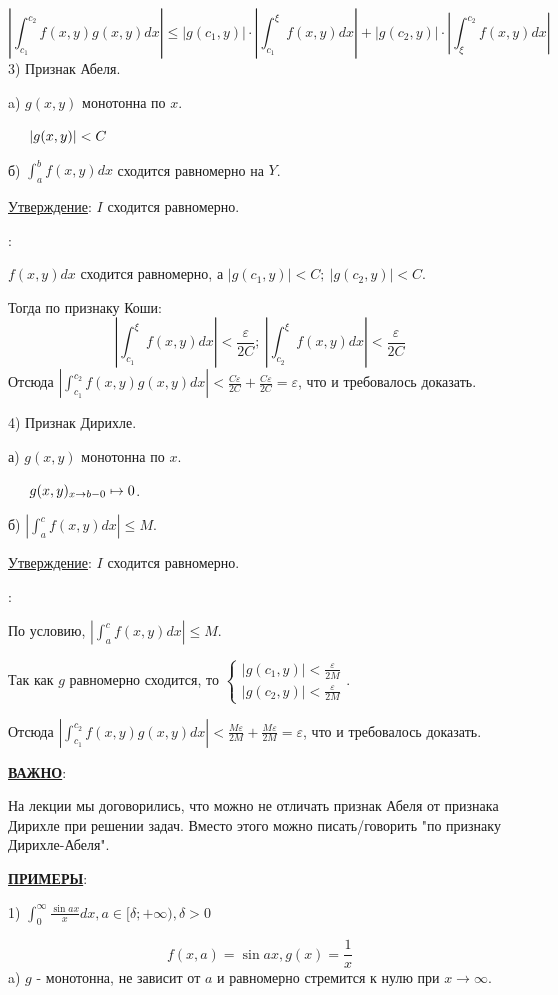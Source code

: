 \documentclass[12pt]{article}
\begin{document}
$$|\int_{c_1}^{c_2} f(x,y) g(x,y) dx|\leq |g(c_1,y)| \cdot |\int_{c_1}^{\xi} f(x,y) dx| + |g(c_2,y) | \cdot |\int_{\xi}^{c_2} f(x,y)dx|$$
3) Признак Абеля.\par
a) $g(x,y)$ монотонна по $x$.\par
$\indent |g(x,y)|<C$\par
б) $\int_a^b f(x,y) dx$ сходится равномерно на $Y$.\par
\uline{Утверждение}: $I$ сходится равномерно.\par
{}:\par
$f(x,y)dx$ сходится равномерно, а $|g(c_1,y)| < C; \ |g(c_2,y)| < C$.\par
Тогда по признаку Коши:
$$|\int_{c_1}^{\xi} f(x,y)dx| < \frac{\varepsilon}{2C}; \ |\int_{c_2}^{\xi} f(x,y)dx| < \frac{\varepsilon}{2C}$$
Отсюда $|\int_{c_1}^{c_2} f(x,y)g(x,y) dx| < \frac {C \varepsilon}{2C} + \frac {C \varepsilon}{2C} = \varepsilon$, что и требовалось доказать.\par
4) Признак Дирихле.\par
а) $g(x,y)$ монотонна по $x$.\par
$\indent g(x,y)_{x \to b-0} \mapsto 0$.\par
б) $|\int_a^c f(x,y) dx| \leq M$.\par
\uline{Утверждение}: $I$ сходится равномерно.\par
{}:\par
По условию, $|\int_a^c f(x,y) dx| \leq M$.\par
Так как $g$ равномерно сходится, то $\begin{cases} |g(c_1, y)| < \frac{\varepsilon}{2M} \\ |g(c_2, y)| < \frac{\varepsilon}{2M} \end{cases}$.\par
Отсюда $|\int_{c_1}^{c_2} f(x,y)g(x,y) dx| < \frac {M \varepsilon}{2M} + \frac {M \varepsilon}{2M} = \varepsilon$, что и требовалось доказать.\par
\uline{\textbf{ВАЖНО}}:\par
На лекции мы договорились, что можно не отличать признак Абеля от признака Дирихле при решении задач. Вместо этого можно писать/говорить "по признаку Дирихле-Абеля".\par
\uline{\textbf{ПРИМЕРЫ}}:\par
1) $\int_{0}^{\infty} \frac{\sin{ax}}{x} dx, a \in [\delta; +\infty), \delta > 0$\par
$$f(x,a) = \sin{ax}, g(x) = \frac{1}{x}$$
a) $g$ - монотонна, не зависит от $a$ и равномерно стремится к нулю при $x \to \infty$.\par
\end{document}

